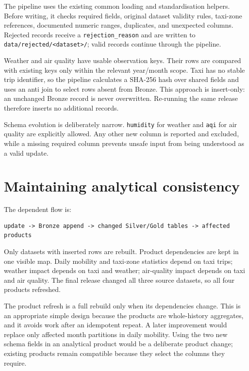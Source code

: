 \documentclass[11pt]{article}
\begin{document}
The pipeline uses the existing common loading and standardisation helpers.
Before writing, it checks required fields, original dataset validity rules,
taxi-zone references, documented numeric ranges, duplicates, and unexpected
columns. Rejected records receive a \texttt{rejection\_reason} and are written
to \texttt{data/rejected/<dataset>/}; valid records continue through the
pipeline.

Weather and air quality have usable observation keys. Their rows are compared
with existing keys only within the relevant year/month scope. Taxi has no
stable trip identifier, so the pipeline calculates a SHA-256 hash over shared
fields and uses an anti join to select rows absent from Bronze. This approach
is insert-only: an unchanged Bronze record is never overwritten. Re-running
the same release therefore inserts no additional records.

Schema evolution is deliberately narrow. \texttt{humidity} for weather and
\texttt{aqi} for air quality are explicitly allowed. Any other new column is
reported and excluded, while a missing required column prevents unsafe input
from being understood as a valid update.

\section{Maintaining analytical consistency}

The dependent flow is:

\begin{verbatim}
update -> Bronze append -> changed Silver/Gold tables -> affected products
\end{verbatim}

Only datasets with inserted rows are rebuilt. Product dependencies are kept in
one visible map. Daily mobility and taxi-zone statistics depend on taxi trips;
weather impact depends on taxi and weather; air-quality impact depends on taxi
and air quality. The final release changed all three source datasets, so all
four products refreshed.

The product refresh is a full rebuild only when its dependencies change. This
is an appropriate simple design because the products are whole-history
aggregates, and it avoids work after an idempotent repeat. A later improvement
would replace only affected month partitions in daily mobility. Using the two
new schema fields in an analytical product would be a deliberate product
change; existing products remain compatible because they select the columns
they require.
\end{document}
